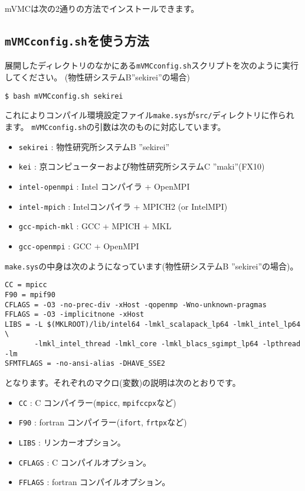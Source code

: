 mVMCは次の2通りの方法でインストールできます。

\subsection{\texttt{mVMCconfig.sh}を使う方法}

展開したディレクトリのなかにある\verb|mVMCconfig.sh|スクリプトを次のように実行してください。
(物性研システムB''sekirei''の場合)
\begin{verbatim}
$ bash mVMCconfig.sh sekirei
\end{verbatim}
これによりコンパイル環境設定ファイル\verb|make.sys|が\verb|src/|ディレクトリに作られます。
\verb|mVMCconfig.sh|の引数は次のものに対応しています。
\begin{itemize}
\item \verb|sekirei| : 物性研究所システムB ''sekirei''
\item \verb|kei| : 京コンピューターおよび物性研究所システムC ''maki''(FX10)
\item \verb|intel-openmpi| : Intel コンパイラ + OpenMPI
\item \verb|intel-mpich| : Intelコンパイラ + MPICH2 (or IntelMPI)
\item \verb|gcc-mpich-mkl| : GCC + MPICH + MKL
\item \verb|gcc-openmpi| : GCC + OpenMPI
\end{itemize}

\verb|make.sys|の中身は次のようになっています(物性研システムB ''sekirei''の場合)。
\begin{verbatim}
CC = mpicc
F90 = mpif90
CFLAGS = -O3 -no-prec-div -xHost -qopenmp -Wno-unknown-pragmas
FFLAGS = -O3 -implicitnone -xHost
LIBS = -L $(MKLROOT)/lib/intel64 -lmkl_scalapack_lp64 -lmkl_intel_lp64 \
       -lmkl_intel_thread -lmkl_core -lmkl_blacs_sgimpt_lp64 -lpthread -lm
SFMTFLAGS = -no-ansi-alias -DHAVE_SSE2
\end{verbatim}
となります。それぞれのマクロ(変数)の説明は次のとおりです。
\begin{itemize}
\item \verb|CC| : C コンパイラー(\verb|mpicc|, \verb|mpifccpx|など)
\item \verb|F90| : fortran コンパイラー(\verb|ifort|, \verb|frtpx|など)
\item \verb|LIBS| : リンカーオプション。
\item \verb|CFLAGS| : C コンパイルオプション。
\item \verb|FFLAGS| : fortran コンパイルオプション。
\end{itemize}


